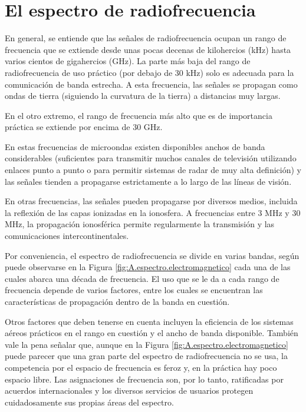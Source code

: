 \section{El espectro de radiofrecuencia}
\label{sec:A.02.espectro.radiofrecuencias}

En general, se entiende que las señales de radiofrecuencia ocupan un rango de frecuencia que se extiende desde unas pocas decenas de kilohercios (kHz) hasta varios cientos de gigahercios (GHz). La parte más baja del rango de radiofrecuencia de uso práctico (por debajo de 30 kHz) solo es adecuada para la comunicación de banda estrecha. A esta frecuencia, las señales se propagan como ondas de tierra (siguiendo la curvatura de la tierra) a distancias muy largas.

En el otro extremo, el rango de frecuencia más alto que es de importancia práctica se extiende por encima de 30 GHz.

En estas frecuencias de microondas existen disponibles anchos de banda considerables (suficientes para transmitir muchos canales de televisión utilizando enlaces punto a punto o para permitir sistemas de radar de muy alta definición) y las señales tienden a propagarse estrictamente a lo largo de las líneas de visión.

En otras frecuencias, las señales pueden propagarse por diversos medios, incluida la reflexión de las capas ionizadas en la ionosfera. A frecuencias entre 3 MHz y 30 MHz, la propagación ionosférica permite regularmente la transmisión y las comunicaciones intercontinentales.

Por conveniencia, el espectro de radiofrecuencia se divide en varias bandas, seg\'un puede observarse en la 
Figura \ref{fig:A.espectro.electromagnetico}
cada una de las cuales abarca una década de frecuencia. El uso que se le da a cada rango de frecuencia depende de varios factores, entre los cuales se encuentran las características de propagación dentro de la banda en cuestión.

Otros factores que deben tenerse en cuenta incluyen la eficiencia de los sistemas aéreos prácticos en el rango en cuestión y el ancho de banda disponible. También vale la pena señalar que, aunque en la Figura \ref{fig:A.espectro.electromagnetico} puede parecer que una gran parte del espectro de radiofrecuencia no se usa, la competencia por el espacio de frecuencia es feroz y, en la pr\'actica hay poco espacio libre.
Las asignaciones de frecuencia son, por lo tanto, ratificadas por acuerdos internacionales y los diversos servicios de usuarios protegen cuidadosamente sus propias áreas del espectro.

